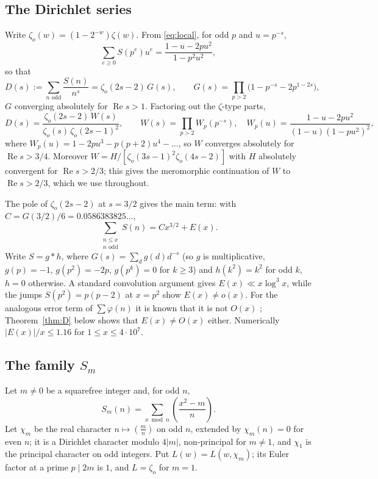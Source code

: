 \documentclass[11pt]{amsart}
\theoremstyle{remark}
\newcommand{\zo}{\zeta_{o}}
\newcommand{\jac}[2]{\left(\frac{#1}{#2}\right)}
\begin{document}
\subsection*{The Dirichlet series}
Write $\zo(w)=(1-2^{-w})\zeta(w)$. From \eqref{eq:local}, for odd $p$ and $u=p^{-s}$,
\[
\sum_{e\ge0}S(p^e)u^e=\frac{1-u-2pu^2}{1-p^2u^2},
\]
so that
\begin{equation}\label{eq:D}
D(s):=\sum_{n\text{ odd}}\frac{S(n)}{n^s}=\zo(2s-2)\,G(s),\qquad G(s)=\prod_{p>2}\big(1-p^{-s}-2p^{1-2s}\big),
\end{equation}
$G$ converging absolutely for $\operatorname{Re}s>1$. Factoring out the $\zeta$-type parts,
\begin{equation}\label{eq:W}
D(s)=\frac{\zo(2s-2)\,W(s)}{\zo(s)\,\zo(2s-1)^2},\qquad W(s)=\prod_{p>2}W_p(p^{-s}),\quad W_p(u)=\frac{1-u-2pu^2}{(1-u)(1-pu^2)^2},
\end{equation}
where $W_p(u)=1-2pu^3-p(p+2)u^4-\dots$, so $W$ converges absolutely for $\operatorname{Re}s>3/4$. Moreover $W=H/[\zo(3s-1)^2\zo(4s-2)]$ with $H$ absolutely convergent for $\operatorname{Re}s>2/3$; this gives the meromorphic continuation of $W$ to $\operatorname{Re}s>2/3$, which we use throughout.

The pole of $\zo(2s-2)$ at $s=3/2$ gives the main term: with $C=G(3/2)/6=0.0586383825\ldots$,
\[
\sum_{\substack{n\le x\\ n\text{ odd}}}S(n)=Cx^{3/2}+E(x).
\]
Write $S=g*h$, where $G(s)=\sum_dg(d)d^{-s}$ (so $g$ is multiplicative, $g(p)=-1$, $g(p^2)=-2p$, $g(p^k)=0$ for $k\ge3$) and $h(k^2)=k^2$ for odd $k$, $h=0$ otherwise. A standard convolution argument gives $E(x)\ll x\log^3x$, while the jumps $S(p^2)=p(p-2)$ at $x=p^2$ show $E(x)\neq o(x)$. For the analogous error term of $\sum\varphi(n)$ it is known that it is not $O(x)$ \cite{PC,ES,Mo}; Theorem~\ref{thm:D} below shows that $E(x)\neq O(x)$ either. Numerically $|E(x)|/x\le1.16$ for $1\le x\le4\cdot10^7$.

\subsection*{The family $S_m$}
Let $m\neq0$ be a squarefree integer and, for odd $n$,
\[
S_m(n)=\sum_{x\bmod n}\jac{x^2-m}{n}.
\]
Let $\chi_m$ be the real character $n\mapsto(\frac mn)$ on odd $n$, extended by $\chi_m(n)=0$ for even $n$; it is a Dirichlet character modulo $4|m|$, non-principal for $m\neq1$, and $\chi_1$ is the principal character on odd integers. Put $L(w)=L(w,\chi_m)$; its Euler factor at a prime $p\mid2m$ is $1$, and $L=\zo$ for $m=1$.
\end{document}

